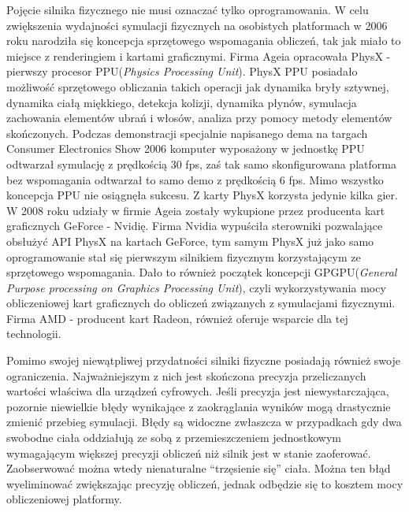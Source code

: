 Pojęcie silnika fizycznego nie musi oznaczać tylko oprogramowania. W celu
zwiększenia wydajności symulacji fizycznych na osobistych platformach w 2006
roku narodziła się koncepcja sprzętowego wspomagania obliczeń, tak jak miało to
miejsce z renderingiem i kartami graficznymi. Firma Ageia opracowała PhysX -
pierwszy procesor PPU(\emph{Physics Processing Unit}). PhysX PPU posiadało
możliwość sprzętowego obliczania takich operacji jak dynamika bryły sztywnej, dynamika
ciałą miękkiego, detekcja kolizji, dynamika płynów, symulacja zachowania
elementów ubrań i włosów, analiza przy pomocy metody elementów skończonych.
Podczas demonstracji specjalnie napisanego dema na targach Consumer Electronics
Show 2006 komputer wyposażony w jednostkę PPU odtwarzał symulację z prędkością
30 fps, zaś tak samo skonfigurowana platforma bez wspomagania odtwarzał to samo
demo z prędkością 6 fps. Mimo wszystko koncepcja PPU nie osiągnęła sukcesu. Z
karty PhysX korzysta jedynie kilka gier. W 2008 roku udziały w firmie Ageia
zostały wykupione przez producenta kart graficznych GeForce - Nvidię. Firma
Nvidia wypuściła sterowniki pozwalające obsłużyć API PhysX na kartach GeForce,
tym samym PhysX już jako samo oprogramowanie stał się pierwszym silnikiem
fizycznym korzystającym ze sprzętowego wspomagania. Dało to również początek
koncepcji GPGPU(\emph{General Purpose processing on Graphics Processing Unit}),
czyli wykorzystywania mocy obliczeniowej kart graficznych do obliczeń związanych
z symulacjami fizycznymi. Firma AMD - producent kart Radeon, również oferuje
wsparcie dla tej technologii.

Pomimo swojej niewątpliwej przydatności silniki fizyczne posiadają również swoje
ograniczenia. Najważniejszym z nich jest skończona precyzja przeliczanych
wartości właściwa dla urządzeń cyfrowych. Jeśli precyzja jest niewystarczająca,
pozornie niewielkie błędy wynikające z zaokrąglania wyników mogą drastycznie
zmienić przebieg symulacji. Błędy są widoczne zwłaszcza w przypadkach gdy dwa
swobodne ciała oddziałują ze sobą z przemieszczeniem jednostkowym wymagającym
większej precyzji obliczeń niż silnik jest w stanie zaoferować. Zaobserwować
można wtedy nienaturalne ``trzęsienie się'' ciała. Można ten błąd wyeliminować
zwiększając precyzję obliczeń, jednak odbędzie się to kosztem mocy obliczeniowej
platformy.

